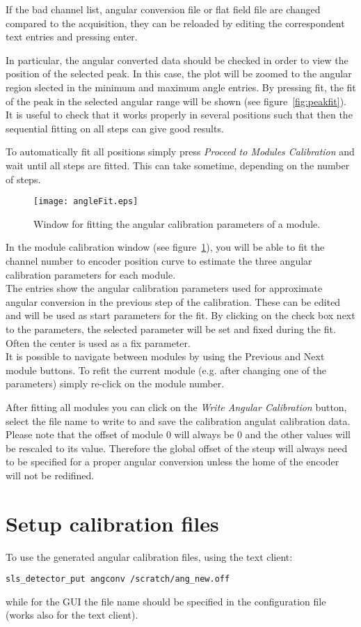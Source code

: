 If the bad channel list, angular conversion file or flat field file are changed compared to the acquisition, they can be reloaded by editing the correspondent text entries and pressing enter.

In particular, the angular converted data should be checked in order to view the position of the selected peak. In this case, the plot will be zoomed to the angular region slected in the minimum and maximum angle entries. By pressing fit, the fit of the peak in the selected angular range will be shown (see figure~\ref{fig:peakfit}).  It is useful to check that it works properly in several positions such that then the sequential fitting on all steps can give good results.

To automatically fit all positions simply press \textit{Proceed to Modules Calibration} and wait until all steps are fitted. This can take sometime, depending on the number of steps.


\begin{figure}
\caption{Window for fitting the angular calibration parameters of a module.} \label{fig:anglefit}
\texttt{[image: angleFit.eps]}
\end{figure} 





In the module calibration window (see figure~\ref{fig:anglefit}), you will be able to fit the channel number to encoder position curve to estimate the three angular calibration parameters for each module.\\
The entries show the angular calibration parameters used for approximate angular conversion in the previous step of the calibration. These can be edited and will be used as start parameters for the fit.
By clicking on the check box next to the parameters, the selected parameter will be set and fixed during the fit. Often the center is used as a fix parameter.\\
It is possible to navigate between modules by using the Previous and Next module buttons. To refit the current module (e.g. after changing one of the parameters) simply re-click on the module number.

After fitting all modules you can click on the \textit{Write Angular Calibration} button, select the file name to write to and save the calibration angulat calibration data. Please note that the offset of module 0 will always be 0 and the other values will be rescaled to its value. Therefore the global offset of the steup will always need to be specified for a proper angular conversion unless the home of the encoder will not be redifined.

\section{Setup calibration files}

To use the generated angular calibration files, using the text client:
\begin{verbatim}
sls_detector_put angconv /scratch/ang_new.off 
\end{verbatim}
while for the GUI the file name should be specified in the configuration file (works also for the text client).


